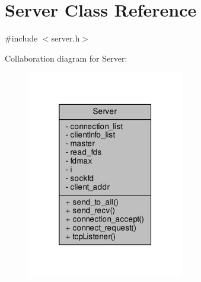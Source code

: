 \hypertarget{class_server}{}\section{Server Class Reference}
\label{class_server}


{\ttfamily \#include $<$server.\+h$>$}



Collaboration diagram for Server\+:
\nopagebreak
\begin{figure}[H]
\begin{center}
\leavevmode
\includegraphics[width=194pt]{class_server__coll__graph}
\end{center}
\end{figure}
